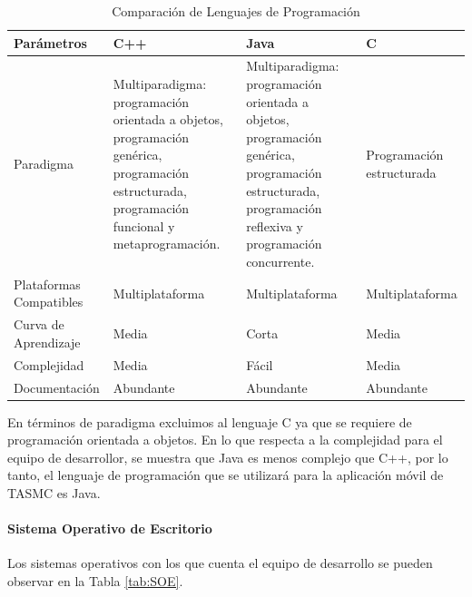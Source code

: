 \begin{table} 
	\begin{center}
		\begin{tabular}{|p{3cm}|p{3cm}|p{3cm}|p{3cm}|}
			\hline \rowcolor[RGB]{51,153,255} 
			\textcolor{blanco}{\bf Parámetros} &
				\textcolor{blanco}{\bf C++} &
				\textcolor{blanco}{\bf Java} &
				\textcolor{blanco}{\bf C} \\
			\hline 
				Paradigma &
				Multiparadigma: programación orientada a objetos, programación genérica, programación estructurada, programación funcional y metaprogramación. &
				Multiparadigma: programación orientada a objetos, programación genérica, programación estructurada, programación reflexiva y programación concurrente. & 
				Programación \newline estructurada \\
      		\hline \rowcolor[RGB]{240,248,255}
      			Plataformas Compatibles &
				Multiplataforma &
				Multiplataforma &
				Multiplataforma \\
      		\hline 
      			Curva de \newline Aprendizaje &
				Media &
				Corta &
				Media \\
      		\hline \rowcolor[RGB]{240,248,255}
      			Complejidad &
				Media &
				Fácil &
				Media \\
      		\hline 
      			Documentación &
				Abundante &
				Abundante &
				Abundante \\
      		\hline 
    		\end{tabular}
	\end{center}
	\caption[Comparación de Lenguajes de Programación]{Comparación de Lenguajes de Programación} 
	\label{tab:lenguProgra}
\end{table}
\newpage
En términos de paradigma excluimos al lenguaje C ya que se requiere de programación orientada a objetos. En lo que respecta a la complejidad para el equipo de desarrollor, se muestra que Java es menos complejo que C++, por lo tanto, el lenguaje de programación que se utilizará para la aplicación móvil de TASMC es Java.

\paragraph{Sistema Operativo de Escritorio}

Los sistemas operativos con los que cuenta el equipo de desarrollo se pueden observar en la Tabla \ref{tab:SOE}.

